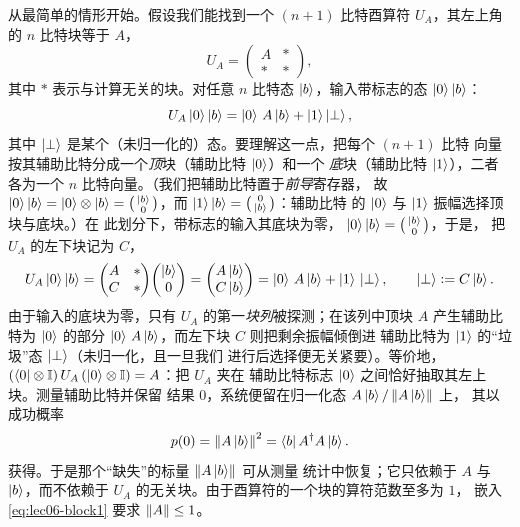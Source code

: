 从最简单的情形开始。假设我们能找到一个 $(n+1)$ 比特酉算符 $U_A$，其左上角的 $n$ 比特块等于 $A$，
\begin{equation}
  U_A=\begin{pmatrix} A & \ast\\ \ast & \ast\end{pmatrix},
  \label{eq:lec06-block1}
\end{equation}
其中 $\ast$ 表示与计算无关的块。对任意 $n$ 比特态
$\ket{b}$，输入带标志的态 $\ket{0}\ket{b}$：
\begin{equation}
  U_A\ket{0}\ket{b}=\ket{0}\,A\ket{b}+\ket{1}\ket{\perp},
  \label{eq:lec06-apply1}
\end{equation}
其中 $\ket{\perp}$ 是某个（未归一化的）态。要理解这一点，把每个 $(n+1)$ 比特
向量按其辅助比特分成一个\emph{顶}块（辅助比特 $\ket0$）和一个
\emph{底}块（辅助比特 $\ket1$），二者各为一个 $n$ 比特向量。（我们把辅助比特置于\emph{前导}寄存器，
故 $\ket0\ket b=\ket0\otimes\ket b
=\left(\begin{smallmatrix}\ket b\\ 0\end{smallmatrix}\right)$，而
$\ket1\ket b=\left(\begin{smallmatrix}0\\ \ket b\end{smallmatrix}\right)$：辅助比特
的 $\ket0$ 与 $\ket1$ 振幅选择顶块与底块。）在
此划分下，带标志的输入其底块为零，
$\ket{0}\ket{b}=\left(\begin{smallmatrix}\ket b\\ 0\end{smallmatrix}\right)$，于是，
把 $U_A$ 的左下块记为 $C$，
\[
  U_A\ket{0}\ket{b}
   =\begin{pmatrix}A&\ast\\ C&\ast\end{pmatrix}\!
    \begin{pmatrix}\ket b\\ 0\end{pmatrix}
   =\begin{pmatrix}A\ket b\\ C\ket b\end{pmatrix}
   =\ket{0}\,A\ket{b}+\ket{1}\,\ket{\perp},
   \qquad \ket{\perp}\vcentcolon= C\ket{b}.
\]
由于输入的底块为零，只有 $U_A$ 的第一\emph{块列}被探测；在该列中顶块 $A$ 产生辅助比特为 $\ket0$ 的部分
$\ket0\,A\ket b$，而左下块 $C$ 则把剩余振幅倾倒进
辅助比特为 $\ket1$ 的``垃圾''态 $\ket{\perp}$（未归一化，且一旦我们
进行后选择便无关紧要）。等价地，
$(\bra{0}\otimes\mathbb{I})\,U_A\,(\ket{0}\otimes\mathbb{I})=A$：把 $U_A$ 夹在
辅助比特标志 $\ket0$ 之间恰好抽取其左上块。测量辅助比特并保留
结果 $0$，系统便留在归一化态 $A\ket{b}/\left\lVert A\ket{b} \right\rVert$ 上，
其以成功概率
\begin{equation}
  p(0)=\left\lVert A\ket{b} \right\rVert^2=\bra{b}A^{\dagger} A\ket{b}.
  \label{eq:lec06-prob1}
\end{equation}
获得。于是那个``缺失''的标量 $\left\lVert A\ket{b} \right\rVert$ 可从测量
统计中恢复；它只依赖于 $A$ 与 $\ket{b}$，而不依赖于 $U_A$ 的无关块。由于酉算符的一个块的算符范数至多为 $1$，
嵌入 \eqref{eq:lec06-block1} 要求 $\left\lVert A \right\rVert\le1$。

